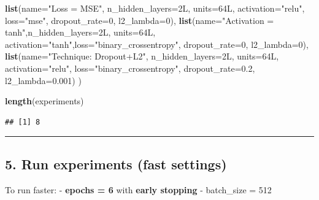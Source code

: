 \documentclass[
]{article}
\newenvironment{Shaded}{\begin{snugshade}}{\end{snugshade}}
\newcommand{\AttributeTok}[1]{\textcolor[rgb]{0.13,0.29,0.53}{#1}}
\newcommand{\DataTypeTok}[1]{\textcolor[rgb]{0.13,0.29,0.53}{#1}}
\newcommand{\DecValTok}[1]{\textcolor[rgb]{0.00,0.00,0.81}{#1}}
\newcommand{\FloatTok}[1]{\textcolor[rgb]{0.00,0.00,0.81}{#1}}
\newcommand{\FunctionTok}[1]{\textcolor[rgb]{0.13,0.29,0.53}{\textbf{#1}}}
\newcommand{\NormalTok}[1]{#1}
\newcommand{\StringTok}[1]{\textcolor[rgb]{0.31,0.60,0.02}{#1}}
\begin{document}
\begin{Shaded}
\begin{Highlighting}[]
  \FunctionTok{list}\NormalTok{(}\AttributeTok{name=}\StringTok{"Loss = MSE"}\NormalTok{,      }\AttributeTok{n\_hidden\_layers=}\DecValTok{2}\DataTypeTok{L}\NormalTok{, }\AttributeTok{units=}\DecValTok{64}\DataTypeTok{L}\NormalTok{, }\AttributeTok{activation=}\StringTok{"relu"}\NormalTok{, }\AttributeTok{loss=}\StringTok{"mse"}\NormalTok{,                 }\AttributeTok{dropout\_rate=}\DecValTok{0}\NormalTok{,   }\AttributeTok{l2\_lambda=}\DecValTok{0}\NormalTok{),}
  \FunctionTok{list}\NormalTok{(}\AttributeTok{name=}\StringTok{"Activation = tanh"}\NormalTok{,}\AttributeTok{n\_hidden\_layers=}\DecValTok{2}\DataTypeTok{L}\NormalTok{, }\AttributeTok{units=}\DecValTok{64}\DataTypeTok{L}\NormalTok{, }\AttributeTok{activation=}\StringTok{"tanh"}\NormalTok{,}\AttributeTok{loss=}\StringTok{"binary\_crossentropy"}\NormalTok{, }\AttributeTok{dropout\_rate=}\DecValTok{0}\NormalTok{,   }\AttributeTok{l2\_lambda=}\DecValTok{0}\NormalTok{),}
  \FunctionTok{list}\NormalTok{(}\AttributeTok{name=}\StringTok{"Technique: Dropout+L2"}\NormalTok{, }\AttributeTok{n\_hidden\_layers=}\DecValTok{2}\DataTypeTok{L}\NormalTok{, }\AttributeTok{units=}\DecValTok{64}\DataTypeTok{L}\NormalTok{, }\AttributeTok{activation=}\StringTok{"relu"}\NormalTok{, }\AttributeTok{loss=}\StringTok{"binary\_crossentropy"}\NormalTok{, }\AttributeTok{dropout\_rate=}\FloatTok{0.2}\NormalTok{, }\AttributeTok{l2\_lambda=}\FloatTok{0.001}\NormalTok{)}
\NormalTok{)}

\FunctionTok{length}\NormalTok{(experiments)}
\end{Highlighting}
\end{Shaded}

\begin{verbatim}
## [1] 8
\end{verbatim}

\begin{center}\rule{0.5\linewidth}{0.5pt}\end{center}

\subsection{5. Run experiments (fast
settings)}\label{run-experiments-fast-settings}

To run faster: - \textbf{epochs = 6} with \textbf{early stopping} -
batch\_size = 512
\end{document}
